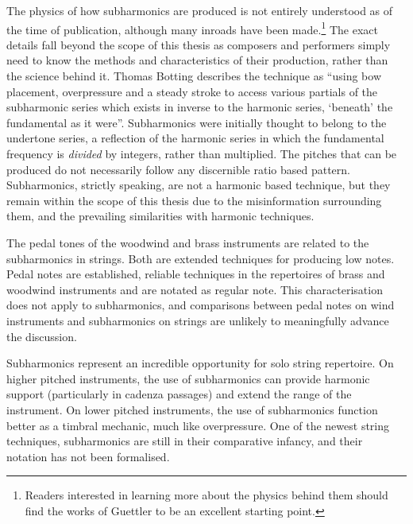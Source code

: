 The physics of how subharmonics are produced is not entirely understood as of the time of publication, although many inroads have been made.\footnote{Readers interested in learning more about the physics behind them should find the works of Guettler to be an excellent starting point.}\autocite[]{guettlerBowedStringDevelopment2002}
The exact details fall beyond the scope of this thesis as composers and performers simply need to know the methods and characteristics of their production, rather than the science behind it.
Thomas Botting describes the technique as ``using bow placement, overpressure and a steady stroke to access various partials of the subharmonic series which exists in inverse to the harmonic series, ‘beneath’ the fundamental as it were''.\autocite[16]{bottingDevelopingPersonalVocabulary2019}
Subharmonics were initially thought to belong to the undertone series, a reflection of the harmonic series in which the fundamental frequency is \emph{divided} by integers, rather than multiplied.\autocite[]{shaahinmohajeriEqualdivisionsoflengthEdl240edo2019}
The pitches that can be produced do not necessarily follow any discernible ratio based pattern.\autocite[]{guettlerWaveAnalysisString1994}
Subharmonics, strictly speaking, are not a harmonic based technique, but they remain within the scope of this thesis due to the misinformation surrounding them, and the prevailing similarities with harmonic techniques.

The pedal tones of the woodwind and brass instruments are related to the subharmonics in strings.
Both are extended techniques for producing low notes. 
Pedal notes are established, reliable techniques in the repertoires of brass and woodwind instruments and are notated as regular note. 
This characterisation does not apply to subharmonics, and comparisons between pedal notes on wind instruments and subharmonics on strings are unlikely to meaningfully advance the discussion.

Subharmonics represent an incredible opportunity for solo string repertoire. 
On higher pitched instruments, the use of subharmonics can provide harmonic support (particularly in cadenza passages) and extend the range of the instrument. 
On lower pitched instruments, the use of subharmonics function better as a timbral mechanic, much like overpressure. 
One of the newest string techniques, subharmonics are still in their comparative infancy, and their notation has not been formalised. 

